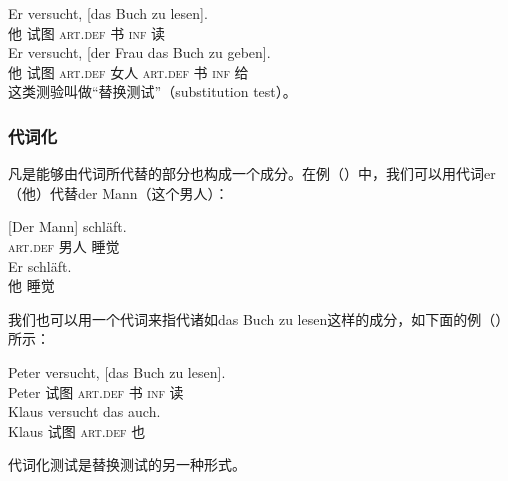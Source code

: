 \eal
\ex\label{ex-das-buch-zu-lesen} 
\gll Er versucht, [das Buch zu lesen].\\
	他 试图 \spacebr{}\textsc{art}.\textsc{def} 书 \textsc{inf} 读\\
\ex 
\gll Er versucht, [der Frau das Buch zu geben].\\
	 他 试图 \spacebr{}\textsc{art}.\textsc{def} 女人 \textsc{art}.\textsc{def} 书 \textsc{inf} 给\\
\zl
%
这类测验叫做“替换测试”（substitution test）。

\subsubsection{代词化}
凡是能够由代词所代替的部分也构成一个成分。在例（）中，我们可以用代词er（他）代替der Mann（这个男人）：

\eal
\ex 
\gll {}[Der Mann] schläft.\\
	 {}\spacebr{}\textsc{art}.\textsc{def} 男人 睡觉\\
\ex 
\gll Er schläft.\\
	 他 睡觉\\
\zl

\noindent
我们也可以用一个代词来指代诸如das Buch zu lesen这样的成分，如下面的例（）所示：

\eal
\ex 
\gll Peter versucht, [das Buch zu lesen].\\
	 Peter  试图 \spacebr{}\textsc{art}.\textsc{def} 书 \textsc{inf} 读\\
\ex 
\gll Klaus versucht das auch.\\
	 Klaus 试图 \textsc{art}.\textsc{def} 也\\
\zl

\noindent
代词化测试是替换测试的另一种形式。

